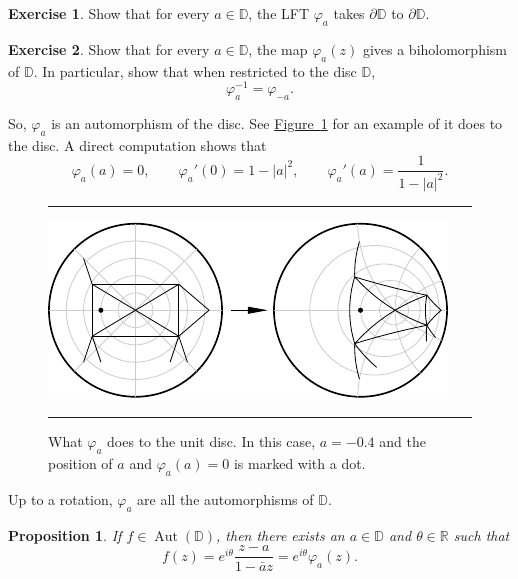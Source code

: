 \documentclass[12pt,openany]{book}
\newcommand{\sabs}[1]{\lvert {#1} \rvert}
\newcommand{\R}{{\mathbb{R}}}
\newcommand{\D}{{\mathbb{D}}}
\theoremstyle{plain}
\newtheorem{prop}[thm]{Proposition}
\theoremstyle{remark}
\theoremstyle{definition}
\newenvironment{exbox}{%
    \def\FrameCommand{\vrule width 1pt \relax\hspace{10pt}}%
    \MakeFramed{\advance\hsize-\width\FrameRestore}%
}{%
    \endMakeFramed
}
\newenvironment{myfig}{%
\begin{figure}[h!t]
\noindent\rule{\textwidth}{0.4pt}\vspace{12pt}\par\centering}%
{\par\noindent\rule{\textwidth}{0.4pt}
\end{figure}}
\theoremstyle{exercise}
\newtheorem{exercise}{Exercise}[section]
\theoremstyle{example}
\newcommand{\figureref}[1]{\hyperref[#1]{Figure~\ref*{#1}}}
\begin{document}
\begin{exbox}
\begin{exercise}
Show that for every $a \in \D$, the LFT $\varphi_a$ takes
$\partial \D$ to $\partial \D$.
\end{exercise}

\begin{exercise}
Show that for every $a \in \D$, the map $\varphi_a(z)$ gives a biholomorphism
of $\D$.
In particular, show that when restricted to the disc $\D$,
\begin{equation*}
\varphi_a^{-1} = \varphi_{-a} .
\end{equation*}
\end{exercise}
\end{exbox}

So, $\varphi_a$ is an automorphism of the disc.
See \figureref{fig:varphiplot} for an example of it does to the disc.
A direct computation shows that
\begin{equation*}
\varphi_a(a) = 0, \qquad
\varphi_a'(0) = 1 - \sabs{a}^2, \qquad
\varphi_a'(a) = \frac{1}{1 - \sabs{a}^2} .
\end{equation*}
\begin{myfig}
\includegraphics{figures/varphiplot}
\caption{What $\varphi_a$ does to the unit disc.   In this case,
$a=-0.4$ and the position of $a$ and $\varphi_a(a)=0$ is marked with a dot.%
\label{fig:varphiplot}}
\end{myfig}

Up to a rotation, $\varphi_a$ are all the automorphisms of $\D$.

\begin{prop}
If $f \in \operatorname{Aut}(\D)$, then there exists an $a \in \D$
and $\theta \in \R$ such that
\begin{equation*}
f(z) = e^{i\theta} \frac{z-a}{1-\bar{a}z} = e^{i\theta} \varphi_a(z).
\end{equation*}
\end{prop}
\end{document}

